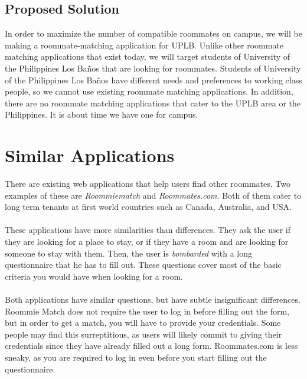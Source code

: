 \documentclass[journal]{./IEEE/IEEEtran}
\newcommand{\UPLB}{University of the Philippines Los Ba\~{n}os }
\begin{document}
    \subsection{Proposed Solution}
    In order to maximize the number of compatible roommates on campus, we will be making a roommate-matching application for UPLB. Unlike other roommate matching applications that exist today, we will target students of \UPLB that are looking for roommates. Students of \UPLB  have different needs and preferences to working class people, so we cannot use existing roommate matching applications. In addition, there are no roommate matching applications that cater to the UPLB area or the Philippines. It is about time we have one for campus.
\newpage
\section{Similar Applications}
\pubidadjcol
There are existing web applications that help users find other roommates. Two examples of these are \textit{ Roommiematch} and \textit{Roommates.com}. Both of them cater to long term tenants at first world countries such as Canada, Australia, and USA.
\\
\\
These applications have more similarities than differences. They ask the user if they are looking for a place to stay, or if they have a room and are looking for someone to stay with them. Then, the user is \textit{bombarded} with a long questionnaire that he has to fill out. These questions cover most of the basic criteria you would have when looking for a room.
\\
\\
\indent Both applications have similar questions, but have subtle insignificant differences. Roommie Match does not require the user to log in before filling out the form, but in order to get a match, you will have to provide your credentials. Some people may find this surreptitious, as users will likely commit to giving their credentials since they have already filled out a long form. Roommates.com is less sneaky, as you are required to log in even before you start filling out the questionnaire.
\end{document}

